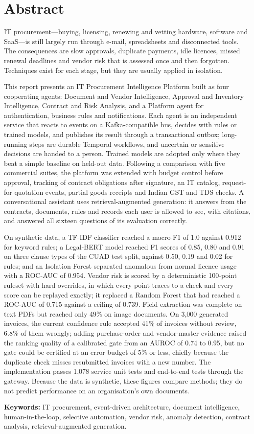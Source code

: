 \vspace{1in}
\chapter*{Abstract}

IT procurement---buying, licensing, renewing and vetting hardware, software and SaaS---is still largely run through e-mail, spreadsheets and disconnected tools. The consequences are slow approvals, duplicate payments, idle licences, missed renewal deadlines and vendor risk that is assessed once and then forgotten. Techniques exist for each stage, but they are usually applied in isolation.

This report presents an IT Procurement Intelligence Platform built as four cooperating agents: Document and Vendor Intelligence, Approval and Inventory Intelligence, Contract and Risk Analysis, and a Platform agent for authentication, business rules and notifications. Each agent is an independent service that reacts to events on a Kafka-compatible bus, decides with rules or trained models, and publishes its result through a transactional outbox; long-running steps are durable Temporal workflows, and uncertain or sensitive decisions are handed to a person. Trained models are adopted only where they beat a simple baseline on held-out data. Following a comparison with five commercial suites, the platform was extended with budget control before approval, tracking of contract obligations after signature, an IT catalog, request-for-quotation events, partial goods receipts and Indian GST and TDS checks. A conversational assistant uses retrieval-augmented generation: it answers from the contracts, documents, rules and records each user is allowed to see, with citations, and answered all sixteen questions of its evaluation correctly.

On synthetic data, a TF-IDF classifier reached a macro-F1 of 1.0 against 0.912 for keyword rules; a Legal-BERT model reached F1 scores of 0.85, 0.80 and 0.91 on three clause types of the CUAD test split, against 0.50, 0.19 and 0.02 for rules; and an Isolation Forest separated anomalous from normal licence usage with a ROC-AUC of 0.954. Vendor risk is scored by a deterministic 100-point ruleset with hard overrides, in which every point traces to a check and every score can be replayed exactly; it replaced a Random Forest that had reached a ROC-AUC of 0.715 against a ceiling of 0.739. Field extraction was complete on text PDFs but reached only 49\% on image documents. On 3,000 generated invoices, the current confidence rule accepted 41\% of invoices without review, 6.8\% of them wrongly; adding purchase-order and vendor-master evidence raised the ranking quality of a calibrated gate from an AUROC of 0.74 to 0.95, but no gate could be certified at an error budget of 5\% or less, chiefly because the duplicate check misses resubmitted invoices with a new number. The implementation passes 1,078 service unit tests and end-to-end tests through the gateway. Because the data is synthetic, these figures compare methods; they do not predict performance on an organisation's own documents.

\vspace{0.5cm}
\noindent\textbf{Keywords:} IT procurement, event-driven architecture, document intelligence, human-in-the-loop, selective automation, vendor risk, anomaly detection, contract analysis, retrieval-augmented generation.
